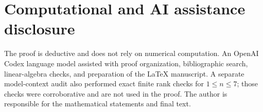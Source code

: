 \documentclass[11pt]{article}
\begin{document}
\section*{Computational and AI assistance disclosure}

The proof is deductive and does not rely on numerical computation.  An
OpenAI Codex language model assisted with proof organization, bibliographic
search, linear-algebra checks, and preparation of the \LaTeX{} manuscript.
A separate model-context audit also performed exact finite rank checks for
$1\leq n\leq7$; those checks were corroborative and are not used in the
proof.  The author is responsible for the mathematical statements and final
text.



\end{document}
